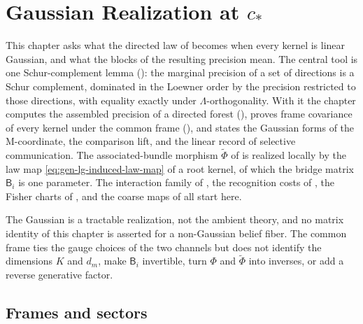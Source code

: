 \chapter{Gaussian Realization at \texorpdfstring{$c_*$}{c*}}
\label{ch:generative-gaussian}

This chapter asks what the directed law of
 becomes when every kernel is linear Gaussian, and what
the blocks of the resulting precision mean. The central tool is one
Schur-complement lemma (): the marginal precision of a
set of directions is a Schur complement, dominated in the Loewner order by the
precision restricted to those directions, with equality exactly under
\(\Lambda\)-orthogonality. With it the chapter computes the assembled
precision of a directed forest (),
proves frame covariance of every kernel under the common frame
(), and states the Gaussian forms of the
M-coordinate, the comparison lift, and the linear record of selective
communication. The associated-bundle morphism \(\widetilde\Phi\) of
 is realized locally by the law map
\eqref{eq:gen-lg-induced-law-map} of a root kernel, of which the bridge matrix
\(\mathsf B_i\) is one parameter. The interaction family of , the
recognition costs of , the Fisher charts of
, and the coarse maps of
 all start here.

The Gaussian is a tractable realization, not the ambient theory, and no matrix
identity of this chapter is asserted for a non-Gaussian belief fiber. The
common frame ties the gauge choices of the two channels but does not identify
the dimensions \(K\) and \(d_m\), make \(\mathsf B_i\) invertible, turn \(\Phi\) and
\(\widetilde\Phi\) into inverses, or add a reverse generative factor.

\section{Frames and sectors}
\label{sec:gen-lg-frame-group}

